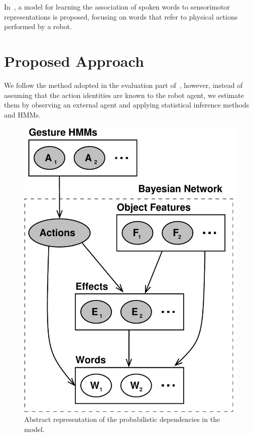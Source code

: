 \documentclass[a4paper]{article}
\begin{document}
In~\cite{stramandinoli:2016:icdl}, a model for learning the association of spoken words to sensorimotor representations is proposed, focusing on words that refer to physical actions performed by a robot.

\section{Proposed Approach}

We follow the method adopted in the evaluation part of~\cite{salvi:2012:smcb}, however, instead of assuming that the action identities are known to the robot agent, we estimate them by observing an external agent and applying statistical inference methods and \acp{HMM}.

\begin{figure}
  \includegraphics[width=\columnwidth]{fullNetAbstract}
  \caption{Abstract representation of the probabilistic dependencies in the model.}
\end{figure}
\end{document}
